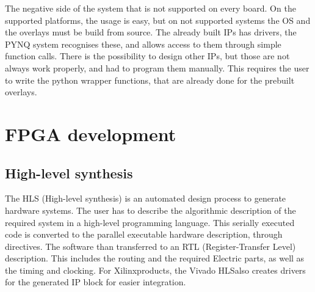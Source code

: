 The negative side of the system that is not supported on every board.
On the supported platforms, the usage is easy, but on not supported systems the OS and the overlays must be build from source.
The already built IPs has drivers, the PYNQ system recognises these, and allows access to them through simple function calls.
There is the possibility to design other IPs, but those are not always work properly, and had to program them manually.
This requires the user to write the python wrapper functions, that are already done for the prebuilt overlays.

\section{FPGA development}

\subsection{High-level synthesis} %
The HLS (High-level synthesis) is an automated design process to generate hardware systems.
The user has to describe the algorithmic description of the required system in a high-level programming language.
This serially executed code is converted to the parallel executable hardware description, through directives.
The software than transferred to an RTL (Register-Transfer Level) description.
This includes the routing and the required Electric parts, as well as the timing and clocking.
For Xilinx\texttrademark products, the Vivado HLS\texttrademark also creates drivers for the generated IP block for easier integration.

